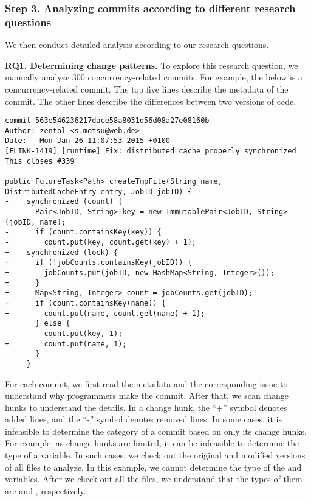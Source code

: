 \subsubsection{Step 3. Analyzing commits according to different research questions} We then conduct detailed analysis according to our research questions.

\textbf{RQ1. Determining change patterns.} To explore this research question, we manually analyze 300 concurrency-related commits. For example, the below is a concurrency-related commit. The top five lines describe the metadata of the commit. The other lines describe the differences between two versions of code.

\begin{lstlisting}
commit 563e546236217dace58a8031d56d08a27e08160b
Author: zentol <s.motsu@web.de>
Date:   Mon Jan 26 11:07:53 2015 +0100
[FLINK-1419] [runtime] Fix: distributed cache properly synchronized
This closes #339

public FutureTask<Path> createTmpFile(String name, DistributedCacheEntry entry, JobID jobID) {
-    synchronized (count) {
-      Pair<JobID, String> key = new ImmutablePair<JobID, String>(jobID, name);
-      if (count.containsKey(key)) {
-        count.put(key, count.get(key) + 1);
+    synchronized (lock) {
+      if (!jobCounts.containsKey(jobID)) {
+        jobCounts.put(jobID, new HashMap<String, Integer>());
+      }
+      Map<String, Integer> count = jobCounts.get(jobID);
+      if (count.containsKey(name)) {
+        count.put(name, count.get(name) + 1);
       } else {
-        count.put(key, 1);
+        count.put(name, 1);
       }
     }
\end{lstlisting}

For each commit, we first read the metadata and the corresponding issue to understand why programmers make the commit. After that, we scan change hunks to understand the details. In a change hunk, the ``+'' symbol denotes added lines, and the ``-'' symbol denotes removed lines. In some cases, it is infeasible to determine the category of a commit based on only its change hunks. For example, as change hunks are limited, it can be infeasible to determine the type of a variable. In such cases, we check out the original and modified versions of all files to analyze. In this example, we cannot determine the type of the  and  variables. After we check out all the files, we understand that the types of them are  and , respectively.

